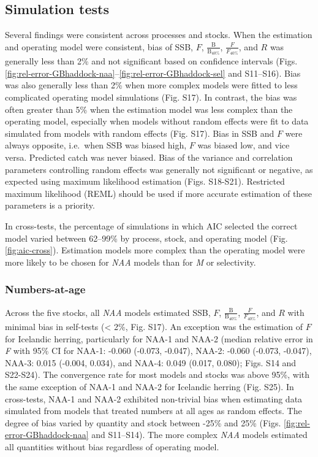 \documentclass[]{article}
\begin{document}
\hypertarget{simulation-tests-1}{%
\subsection{Simulation tests}\label{simulation-tests-1}}

Several findings were consistent across processes and stocks. When the
estimation and operating model were consistent, bias of SSB, \(F\),
\(\frac{\text{B}}{\text{B}_{40\%}}\), \(\frac{F}{F_{40\%}}\), and \(R\)
was generally less than 2\% and not significant based on confidence
intervals (Figs.
\ref{fig:rel-error-GBhaddock-naa}--\ref{fig:rel-error-GBhaddock-sel} and
S11--S16). Bias was also generally less than 2\% when more complex
models were fitted to less complicated operating model simulations (Fig.
S17). In contrast, the bias was often greater than 5\% when the
estimation model was less complex than the operating model, especially
when models without random effects were fit to data simulated from
models with random effects (Fig. S17). Bias in SSB and \(F\) were always
opposite, i.e.~when SSB was biased high, \(F\) was biased low, and vice
versa. Predicted catch was never biased. Bias of the variance and
correlation parameters controlling random effects was generally not
significant or negative, as expected using maximum likelihood estimation
(Figs. S18-S21). Restricted maximum likelihood (REML) should be used if
more accurate estimation of these parameters is a priority.

In cross-tests, the percentage of simulations in which AIC selected the
correct model varied between 62--99\% by process, stock, and operating
model (Fig. \ref{fig:aic-cross}). Estimation models more complex than
the operating model were more likely to be chosen for \emph{NAA} models
than for \emph{M} or selectivity.

\hypertarget{numbers-at-age}{%
\subsubsection{Numbers-at-age}\label{numbers-at-age}}

Across the five stocks, all \emph{NAA} models estimated SSB, \(F\),
\(\frac{\text{B}}{\text{B}_{40\%}}\), \(\frac{F}{F_{40\%}}\), and \(R\)
with minimal bias in self-tests (\textless{} 2\%, Fig. S17). An
exception was the estimation of \(F\) for Icelandic herring,
particularly for NAA-1 and NAA-2 (median relative error in \emph{F} with
95\% CI for NAA-1: -0.060 (-0.073, -0.047), NAA-2: -0.060 (-0.073,
-0.047), NAA-3: 0.015 (-0.004, 0.034), and NAA-4: 0.049 (0.017, 0.080);
Figs. S14 and S22-S24). The convergence rate for most models and stocks
was above 95\%, with the same exception of NAA-1 and NAA-2 for Icelandic
herring (Fig. S25). In cross-tests, NAA-1 and NAA-2 exhibited
non-trivial bias when estimating data simulated from models that treated
numbers at all ages as random effects. The degree of bias varied by
quantity and stock between -25\% and 25\% (Figs.
\ref{fig:rel-error-GBhaddock-naa} and S11--S14). The more complex
\emph{NAA} models estimated all quantities without bias regardless of
operating model.
\end{document}
